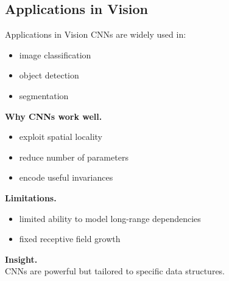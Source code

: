 \documentclass[aspectratio=169,11pt]{beamer}
\begin{document}
\subsection{Applications in Vision}
\begin{frame}[t,allowframebreaks]{Applications in Vision}
\small
CNNs are widely used in:

\begin{itemize}
    \item image classification
    \item object detection
    \item segmentation
\end{itemize}

\textbf{Why CNNs work well.}\\ \begin{itemize}
    \item exploit spatial locality
    \item reduce number of parameters
    \item encode useful invariances
\end{itemize}

\textbf{Limitations.}\\ \begin{itemize}
    \item limited ability to model long-range dependencies
    \item fixed receptive field growth
\end{itemize}

\textbf{Insight.}\\ CNNs are powerful but tailored to specific data structures.
\end{frame}
\end{document}
